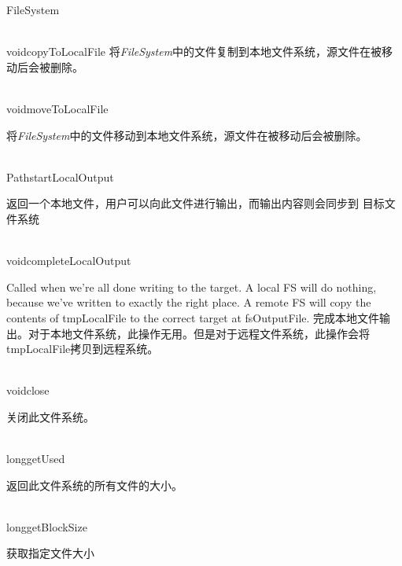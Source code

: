 \begin{XeClass}{FileSystem}
\begin{XeMethod}{\XePublic\\ }{void}{copyToLocalFile}
 将\emph{FileSystem}中的文件复制到本地文件系统，源文件在被移动后会被删除。

  \end{XeMethod}

  \begin{XeMethod}{\XePublic\\ }{void}{moveToLocalFile}
       
 将\emph{FileSystem}中的文件移动到本地文件系统，源文件在被移动后会被删除。

  \end{XeMethod}

  \begin{XeMethod}{\XePublic\\ }{Path}{startLocalOutput}
       
 返回一个本地文件，用户可以向此文件进行输出，而输出内容则会同步到
 目标文件系统

  \end{XeMethod}

  \begin{XeMethod}{\XePublic\\ }{void}{completeLocalOutput}
       
 Called when we're all done writing to the target.  A local FS will
 do nothing, because we've written to exactly the right place.  A remote
 FS will copy the contents of tmpLocalFile to the correct target at
 fsOutputFile.
 完成本地文件输出。对于本地文件系统，此操作无用。但是对于远程文件系统，此操作会将
 tmpLocalFile拷贝到远程系统。

  \end{XeMethod}

  \begin{XeMethod}{\XePublic\\ }{void}{close}
       
 关闭此文件系统。

  \end{XeMethod}

  \begin{XeMethod}{\XePublic\\ }{long}{getUsed}
       
 返回此文件系统的所有文件的大小。

  \end{XeMethod}

  \begin{XeMethod}{\XePublic\\ }{long}{getBlockSize}
       
 获取指定文件大小

  \end{XeMethod}


\end{XeClass}
